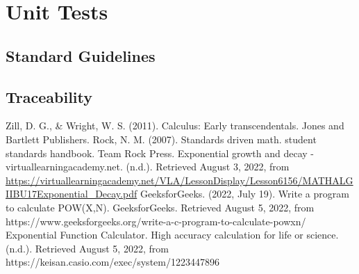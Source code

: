 \documentclass[a4paper,12pt]{report}
\begin{document}
\section{Unit Tests}
\subsection{Standard Guidelines}
\subsection{Traceability}






\begin{thebibliography}{9}
 Zill, D. G., \& Wright, W. S. (2011). Calculus: Early transcendentals. Jones and Bartlett Publishers.
 Rock, N. M. (2007). Standards driven math. student standards handbook. Team Rock Press.
Exponential growth and decay - virtuallearningacademy.net. (n.d.). Retrieved August 3, 2022, from  \url{https://virtuallearningacademy.net/VLA/LessonDisplay/Lesson6156/MATHALGIIBU17Exponential_Decay.pdf}
GeeksforGeeks. (2022, July 19). Write a program to calculate POW(X,N). GeeksforGeeks. Retrieved August 5, 2022, from https://www.geeksforgeeks.org/write-a-c-program-to-calculate-powxn/
Exponential Function Calculator. High accuracy calculation for life or science. (n.d.). Retrieved August 5, 2022, from https://keisan.casio.com/exec/system/1223447896
\end{thebibliography}
\end{document}
